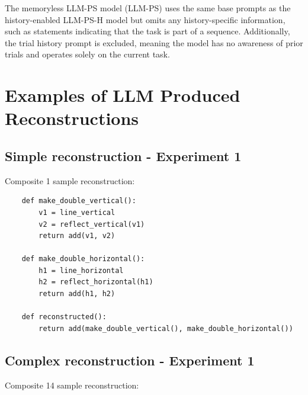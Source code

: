 \documentclass{article}
\begin{document}
The memoryless LLM-PS model (LLM-PS) uses the same base prompts as the history-enabled LLM-PS-H model but omits any history-specific information, such as statements indicating that the task is part of a sequence. Additionally, the trial history prompt is excluded, meaning the model has no awareness of prior trials and operates solely on the current task.

\section{Examples of LLM Produced Reconstructions}

\subsection{Simple reconstruction - Experiment 1}

Composite 1 sample reconstruction:

\begin{verbatim}
	def make_double_vertical():
	    v1 = line_vertical
	    v2 = reflect_vertical(v1)
	    return add(v1, v2)

	def make_double_horizontal():
	    h1 = line_horizontal
	    h2 = reflect_horizontal(h1)
	    return add(h1, h2)

	def reconstructed():
	    return add(make_double_vertical(), make_double_horizontal())
\end{verbatim}

\subsection{Complex reconstruction - Experiment 1}

Composite 14 sample reconstruction:
\end{document}
